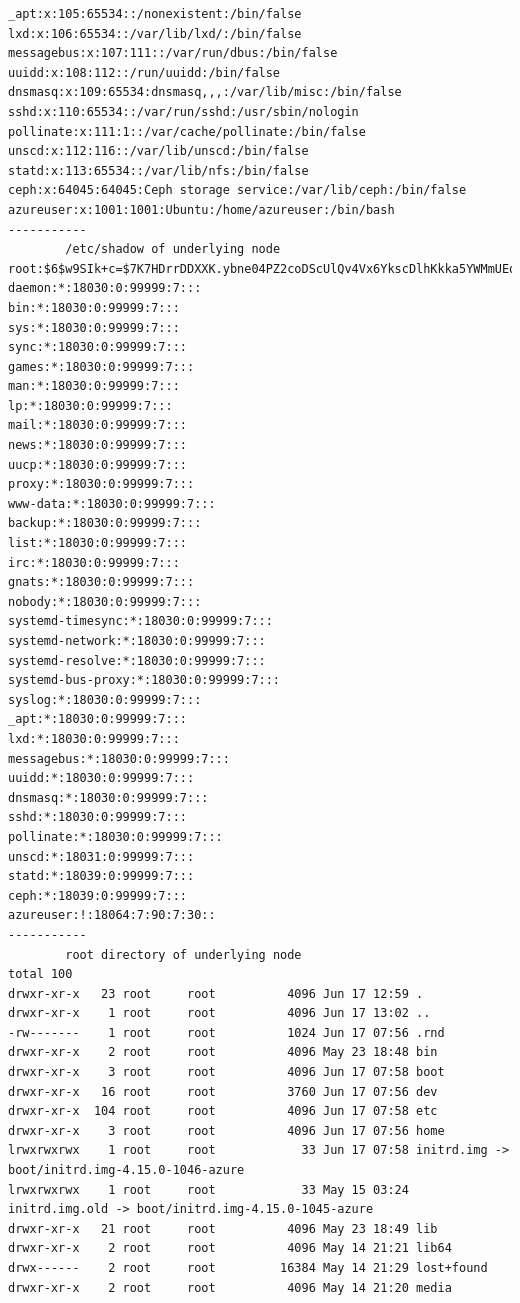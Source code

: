\begin{lstlisting}
_apt:x:105:65534::/nonexistent:/bin/false
lxd:x:106:65534::/var/lib/lxd/:/bin/false
messagebus:x:107:111::/var/run/dbus:/bin/false
uuidd:x:108:112::/run/uuidd:/bin/false
dnsmasq:x:109:65534:dnsmasq,,,:/var/lib/misc:/bin/false
sshd:x:110:65534::/var/run/sshd:/usr/sbin/nologin
pollinate:x:111:1::/var/cache/pollinate:/bin/false
unscd:x:112:116::/var/lib/unscd:/bin/false
statd:x:113:65534::/var/lib/nfs:/bin/false
ceph:x:64045:64045:Ceph storage service:/var/lib/ceph:/bin/false
azureuser:x:1001:1001:Ubuntu:/home/azureuser:/bin/bash
-----------
        /etc/shadow of underlying node
root:$6$w9SIk+c=$7K7HDrrDDXXK.ybne04PZ2coDScUlQv4Vx6YkscDlhKkka5YWMmUEoPiTsmarCssQr1CCm2NqLzdKaaIXrI04/:18039:0:99999:7:::
daemon:*:18030:0:99999:7:::
bin:*:18030:0:99999:7:::
sys:*:18030:0:99999:7:::
sync:*:18030:0:99999:7:::
games:*:18030:0:99999:7:::
man:*:18030:0:99999:7:::
lp:*:18030:0:99999:7:::
mail:*:18030:0:99999:7:::
news:*:18030:0:99999:7:::
uucp:*:18030:0:99999:7:::
proxy:*:18030:0:99999:7:::
www-data:*:18030:0:99999:7:::
backup:*:18030:0:99999:7:::
list:*:18030:0:99999:7:::
irc:*:18030:0:99999:7:::
gnats:*:18030:0:99999:7:::
nobody:*:18030:0:99999:7:::
systemd-timesync:*:18030:0:99999:7:::
systemd-network:*:18030:0:99999:7:::
systemd-resolve:*:18030:0:99999:7:::
systemd-bus-proxy:*:18030:0:99999:7:::
syslog:*:18030:0:99999:7:::
_apt:*:18030:0:99999:7:::
lxd:*:18030:0:99999:7:::
messagebus:*:18030:0:99999:7:::
uuidd:*:18030:0:99999:7:::
dnsmasq:*:18030:0:99999:7:::
sshd:*:18030:0:99999:7:::
pollinate:*:18030:0:99999:7:::
unscd:*:18031:0:99999:7:::
statd:*:18039:0:99999:7:::
ceph:*:18039:0:99999:7:::
azureuser:!:18064:7:90:7:30::
-----------
        root directory of underlying node
total 100
drwxr-xr-x   23 root     root          4096 Jun 17 12:59 .
drwxr-xr-x    1 root     root          4096 Jun 17 13:02 ..
-rw-------    1 root     root          1024 Jun 17 07:56 .rnd
drwxr-xr-x    2 root     root          4096 May 23 18:48 bin
drwxr-xr-x    3 root     root          4096 Jun 17 07:58 boot
drwxr-xr-x   16 root     root          3760 Jun 17 07:56 dev
drwxr-xr-x  104 root     root          4096 Jun 17 07:58 etc
drwxr-xr-x    3 root     root          4096 Jun 17 07:56 home
lrwxrwxrwx    1 root     root            33 Jun 17 07:58 initrd.img -> boot/initrd.img-4.15.0-1046-azure
lrwxrwxrwx    1 root     root            33 May 15 03:24 initrd.img.old -> boot/initrd.img-4.15.0-1045-azure
drwxr-xr-x   21 root     root          4096 May 23 18:49 lib
drwxr-xr-x    2 root     root          4096 May 14 21:21 lib64
drwx------    2 root     root         16384 May 14 21:29 lost+found
drwxr-xr-x    2 root     root          4096 May 14 21:20 media

\end{lstlisting}
